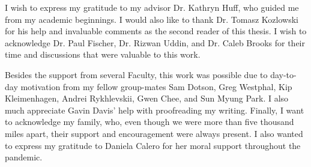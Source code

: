 
I wish to express my gratitude to my advisor Dr. Kathryn Huff, who guided me from my academic beginnings.
I would also like to thank Dr. Tomasz Kozlowski for his help and invaluable comments as the second reader of this thesis.
I wish to acknowledge Dr. Paul Fischer, Dr. Rizwan Uddin, and Dr. Caleb Brooks for their time and discussions that were valuable to this work.

Besides the support from several Faculty, this work was possible due to day-to-day motivation from my fellow group-mates Sam Dotson, Greg Westphal, Kip Kleimenhagen, Andrei Rykhlevskii, Gwen Chee, and Sun Myung Park.
I also much appreciate Gavin Davis' help with proofreading my writing.
Finally, I want to acknowledge my family, who, even though we were more than five thousand miles apart, their support and encouragement were always present.
I also wanted to express my gratitude to Daniela Calero for her moral support throughout the pandemic.
